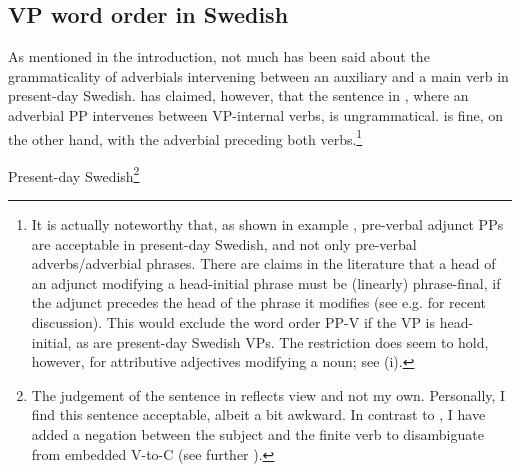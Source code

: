 \documentclass[output=paper, colorlinks, citecolor=brown]{langscibook}
\begin{document}
\subsection{VP word order in Swedish}\label{sec:sangfelt:3.2}

As mentioned in the introduction, not much has been said about the grammaticality of adverbials intervening between an auxiliary and a main verb in present-day Swedish. \citet[157]{Petzell2011} has claimed, however, that the sentence in , where an adverbial PP intervenes between VP-internal verbs, is ungrammatical.  is fine, on the other hand, with the adverbial preceding both verbs.\footnote{It is actually noteworthy that, as shown in example , pre-verbal adjunct PPs are acceptable in present-day Swedish, and not only pre-verbal adverbs\slash adverbial phrases. There are claims in the literature that a head of an adjunct modifying a head-initial phrase must be (linearly) phrase-final, if the adjunct precedes the head of the phrase it modifies (see e.g. \citet{Haider_left-left_nodate} for recent discussion). This would exclude the word order PP-V if the VP is head-initial, as are present-day Swedish VPs. The restriction does seem to hold, however, for attributive adjectives modifying a noun; see (i). 
\z}

\ea Present-day Swedish\footnote{The judgement of the sentence in  reflects  view and not my own. Personally, I find this sentence acceptable, albeit a bit awkward. In contrast to \citet[157]{Petzell2011}, I have added a negation between the subject and the finite verb to disambiguate from embedded V-to-C (see further ).}
\label{ex:sangfelt:15}

\z 
\z 
\end{document}
